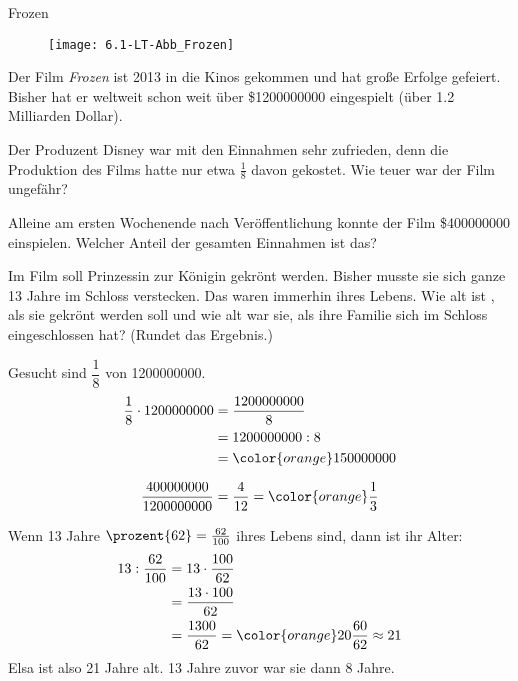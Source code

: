 \documentclass[12pt,a5paper,landscape]{scrartcl}
\def\clrLsg{\color{orange}}
\begin{document}
	\begin{karte3}[\symPartner]{Frozen}
		\begin{wrapfigure}[11]{r}{0pt}
			\texttt{[image: 6.1-LT-Abb\_Frozen]}
		\end{wrapfigure}
		
		Der Film \emph{Frozen} ist 2013 in die Kinos gekommen und hat große Erfolge gefeiert.
		Bisher hat er weltweit schon weit über \$\num{1200000000} eingespielt (über \num{1,2} Milliarden Dollar).
		
		\begin{enumeratea}\small
			\item Der Produzent Disney war mit den Einnahmen sehr zufrieden, denn die Produktion des Films hatte nur etwa $\tfrac{1}{8}$ davon gekostet. Wie teuer war der Film ungefähr?
			
			\item Alleine am ersten Wochenende nach Veröffentlichung konnte der Film \$\num{400000000} einspielen. Welcher Anteil der gesamten Einnahmen ist das?
			
			\item Im Film soll Prinzessin  zur Königin gekrönt werden. Bisher musste sie sich ganze \num{13} Jahre im Schloss verstecken. Das waren immerhin  ihres Lebens. Wie alt ist , als sie gekrönt werden soll und wie alt war sie, als ihre Familie sich im Schloss eingeschlossen hat? (Rundet das Ergebnis.)
		\end{enumeratea}
		
	\end{karte3}
	
	\begin{loesungskarte}
		\begin{multicols}{2}
		\begin{enumeratea}
			\item Gesucht sind $\dfrac{1}{8}$ von \num{1200000000}.
			\begin{align*}
				\frac{1}{8}\cdot 1200000000 &= \frac{1200000000}{8} \\
					&= 1200000000 : 8 \\
					&= \clrLsg 150000000
			\end{align*}
			
			\item
			\[ \frac{400000000}{1200000000} = \frac{4}{12} = \clrLsg\frac{1}{3} \]
			
			\item Wenn \num{13} Jahre $\prozent{62} = \tfrac{62}{100}$ ihres Lebens sind, dann ist ihr Alter:
			\begin{align*}
				13: \frac{62}{100} &= 13\cdot \frac{100}{62} \\
					&= \frac{13\cdot 100}{62} \\
					&= \frac{1300}{62} = \clrLsg 20\frac{60}{62}\approx 21
			\end{align*}
			Elsa ist also \num{21} Jahre alt. \num{13} Jahre zuvor war sie dann \num{8} Jahre.
		\end{enumeratea}
		\end{multicols}
	\end{loesungskarte}
	
\end{document}
